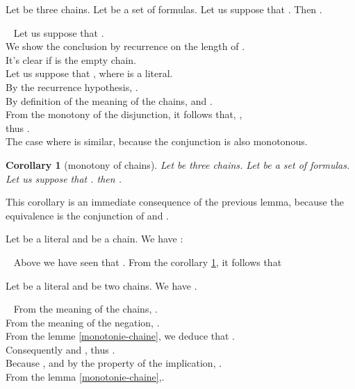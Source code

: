 \documentclass{article}
\newtheorem{corollaire}[theoreme]{Corollary}
\newenvironment{preuve}{\noindent {\em Proof :}\ }{{\hfill
    }\vspace{.5pc}} \newcommand{\sg}{\!\!<\!\!}
\begin{document}
\begin{lemme}\label{monotonie-chaine}
Let  be three chains. Let  be a set of formulas.
Let us suppose that 
 . Then . 
\end{lemme}

\begin{preuve}
Let us suppose that . \\
We show the conclusion by recurrence on the length of . \\
It's clear if  is the empty chain.\\
Let us suppose that , where  is a literal.\\
By the recurrence hypothesis,  .\\
By definition of the meaning of the chains,  and .\\
From the monotony of the disjunction, it follows that, , \\thus 
.\\
The case where  is similar, because the conjunction is also monotonous.
\end{preuve}

\begin{corollaire}[monotony of chains]\label{monotonie-chaine-egal}
Let  be three chains. Let  be a set of formulas.
Let us suppose that . then .
\end{corollaire}

This corollary is an immediate consequence of the previous lemma, because the equivalence  is the
conjunction of 
  and .


\begin{lemme}\label{coherence-enlevement}
Let  be a literal and  be a chain. We have : 
\end{lemme}

\begin{preuve}
Above we have seen that . From the corollary \ref{monotonie-chaine-egal}, it follows that 
\end{preuve}

\begin{lemme}\label{coherence-reduction}
Let  be a literal and  be two chains. We have .
\end{lemme}

\begin{preuve}
From the meaning of the chains, .\\
From the meaning of the negation, .\\
From the lemme \ref{monotonie-chaine}, we deduce that .\\
Consequently  and , thus .\\
Because , and by the property of the implication, .\\
From the lemma \ref{monotonie-chaine},.
\end{preuve}
\end{document}
